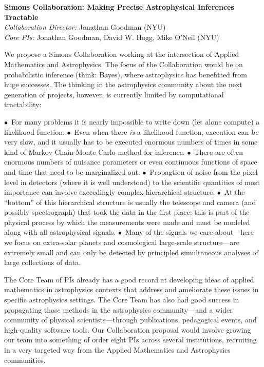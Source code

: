 \documentclass[12pt]{article}
\newcommand{\hoggitem}{$\bullet$}
\begin{document}
\sloppy\sloppypar\thispagestyle{empty}

\noindent
\textbf{Simons Collaboration: Making Precise Astrophysical Inferences Tractable}\\
\textit{Collaboration Director:} Jonathan Goodman (NYU)\\
\textit{Core PIs:} Jonathan Goodman, David W. Hogg, Mike O'Neil (NYU)
\bigskip

We propose a Simons Collaboration working at the intersection of
Applied Mathematics and Astrophysics.
The focus of the Collaboration would be on probabilistic inference
(think: Bayes), where astrophysics has benefitted from huge successes.
The thinking in the astrophysics community about the next generation of
projects, however, is currently limited by computational tractability:

\hoggitem~For many problems it is nearly impossible to write down (let
alone compute) a likelihood function.
\hoggitem~Even when there \emph{is} a likelihood function, execution
can be very slow, and it usually has to be executed enormous numbers
of times in some kind of Markov Chain Monte Carlo method for
inference.
\hoggitem~There are often enormous numbers of nuisance parameters or
even continuous functions of space and time that need to be
marginalized out.
\hoggitem~Propagtion of noise from the pixel level in detectors (where
it is well understood) to the scientific quantities of most importance
can involve exceedingly complex hierarchical structure.
\hoggitem~At the ``bottom'' of this hierarchical structure is usually
the telescope and camera (and possibly spectrograph) that took the
data in the first place; this is part of the physical process by which
the measurements were made and must be modeled along with all
astrophysical signals.
\hoggitem~Many of the signals we care about---here we focus on
extra-solar planets and cosmological large-scale structure---are
extremely small and can only be detected by principled simultaneous
analyses of large collections of data.

The Core Team of PIs already has a good record at developing ideas of
applied mathematics in astrophysics contexts that address and
ameliorate these issues in specific astrophysics settings.
The Core Team has also had good success in propagating those methods
in the astrophysics community---and a wider community of physical
scientists---through publications, pedagogical events, and
high-quality software tools.
Our Collaboration proposal would involve growing our team into
something of order eight PIs across several institutions, recruiting
in a very targeted way from the Applied Mathematics and Astrophysics
communities.
\end{document}
